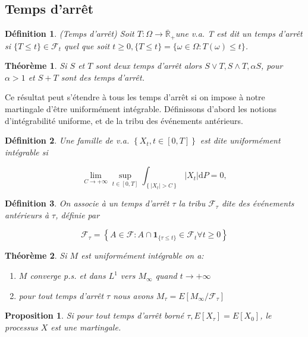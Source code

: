 \documentclass[A4paper,12pt]{report}
\newtheorem{proposition}{Proposition}[chapter]
\newtheorem{theorem}{Th\'eor\`eme}[chapter]
\newtheorem{definition}{D\'efinition}[chapter]
\begin{document}
\subsection{Temps d'arrêt}
\begin{definition} 
(Temps d'arrêt) Soit $T: \Omega \rightarrow \overline{\mathbb{R}}_{+}$une v.a. T est dit un temps d'arrêt si $\{T \leq t\} \in \mathcal{F}_{t}$ quel que soit $t \geq 0,\{T \leq t\}=\{\omega \in \Omega: T(\omega) \leq t\}$. 
\end{definition} 
\begin{theorem} Si $S$ et $T$ sont deux temps d'arrêt alors $S \vee T, S \wedge T, \alpha S$, pour $\alpha>1$ et $S+T$ sont des temps d'arrêt.
\end{theorem}
Ce résultat peut s'étendre à tous les temps d'arrêt si on impose à notre martingale d'être  uniformément intégrable.
Définissons d'abord les notions d'intégrabilité uniforme, et de la tribu des événements antérieurs.
\begin{definition} Une famille de v.a. $\left\{X_{t}, t \in [0, T]\right\}$ est dite uniformément intégrable si

$$
\lim _{C \rightarrow+\infty} \sup _{t \in [0, T]} \int_{\left\{\left|X_{t}\right| > C\right\}}\left|X_{t}\right| \mathrm{d} P=0,
$$
\end{definition}
\begin{definition}
 On associe à un temps d'arrêt $\tau$ la tribu $\mathcal{F}_{\tau}$ dite des événements antérieurs à $\tau$, définie par

$$
\mathcal{F}_{\tau}=\left\{A \in \mathcal{F}: A \cap \mathbf{1}_{\{\tau \leq t\}} \in \mathcal{F}_{t} \forall t \geq 0\right\} 
$$
\end{definition}
\begin{theorem}
Si $M$ est uniformément intégrable on a:
\begin{enumerate}
\item $M$ converge p.s. et dans $L^{1}$ vers $M_{\infty}$ quand $t \rightarrow+\infty$ 
\item pour tout temps d'arrêt $\tau$ nous avons $M_{\tau}=E\left[M_{\infty} / \mathcal{F}_{\tau}\right]$
\end{enumerate} 
\end{theorem}
\begin{proposition} Si pour tout temps d'arrêt borné $\tau, E\left[X_{\tau}\right]=E\left[X_{0}\right]$, le processus $X$ est une martingale.
\end{proposition}
\end{document}
